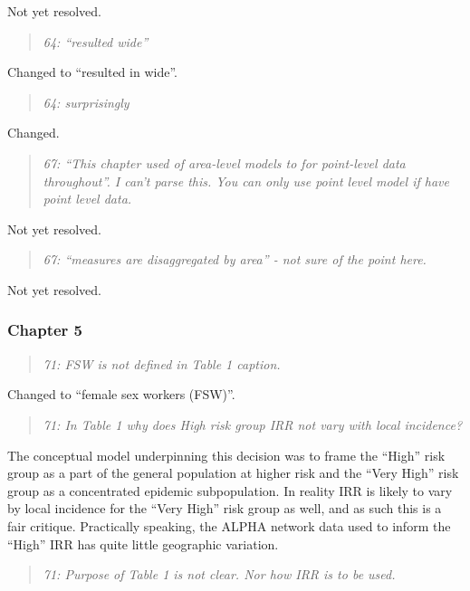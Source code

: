 \documentclass[
  12pt,
]{article}
\begin{document}
Not yet resolved.

\begin{quote}
\emph{64: ``resulted wide''}
\end{quote}

Changed to ``resulted in wide''.

\begin{quote}
\emph{64: surprisingly}
\end{quote}

Changed.

\begin{quote}
\emph{67: ``This chapter used of area-level models to for point-level
data throughout''. I can't parse this. You can only use point level
model if have point level data.}
\end{quote}

Not yet resolved.

\begin{quote}
\emph{67: ``measures are disaggregated by area'' - not sure of the point
here.}
\end{quote}

Not yet resolved.

\subsubsection{Chapter 5}\label{chapter-5-1}

\begin{quote}
\emph{71: FSW is not defined in Table 1 caption.}
\end{quote}

Changed to ``female sex workers (FSW)''.

\begin{quote}
\emph{71: In Table 1 why does High risk group IRR not vary with local
incidence?}
\end{quote}

The conceptual model underpinning this decision was to frame the
``High'' risk group as a part of the general population at higher risk
and the ``Very High'' risk group as a concentrated epidemic
subpopulation. In reality IRR is likely to vary by local incidence for
the ``Very High'' risk group as well, and as such this is a fair
critique. Practically speaking, the ALPHA network data used to inform
the ``High'' IRR has quite little geographic variation.

\begin{quote}
\emph{71: Purpose of Table 1 is not clear. Nor how IRR is to be used.}
\end{quote}
\end{document}
